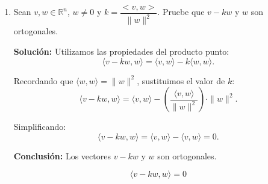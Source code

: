 \documentclass[a4paper]{article}
\begin{document}
\begin{enumerate}
\begin{enumerate}
    Satisfaciendo:
    \[
    A = P D P^{-1}
    \]

    \textbf{Conclusión:} \( A \) es diagonalizable, con:
    \[
    \boxed{
    D = \begin{pmatrix}
    1 & 0 & 0 \\
    0 & -1 & 0 \\
    0 & 0 & 3
    \end{pmatrix}, \quad
    P = \begin{pmatrix}
    1 & -1 & 0 \\
    0 & 1 & -1 \\
    0 & 0 & 2
    \end{pmatrix}
    }
    \]
\end{enumerate}
\item Sean $v,w \in \mathbb{R}^n$, $w\neq 0$ y $ k = \dfrac{<v,w>}{\|w\|^2}.$ Pruebe que $v-kw$ y $w$ son ortogonales.


\textbf{Solución:}
Utilizamos las propiedades del producto punto:
\[
\langle v - kw, w \rangle = \langle v, w \rangle - k \langle w, w \rangle.
\]

Recordando que \( \langle w, w \rangle = \|w\|^2 \), sustituimos el valor de \( k \):
\[
\langle v - kw, w \rangle = \langle v, w \rangle - \left( \frac{\langle v, w \rangle}{\|w\|^2} \right) \cdot \|w\|^2.
\]

Simplificando:
\[
\langle v - kw, w \rangle = \langle v, w \rangle - \langle v, w \rangle = 0.
\]

\textbf{Conclusión:}  
Los vectores \( v - kw \) y \( w \) son ortogonales.

\[
\boxed{ \langle v - kw, w \rangle = 0 }
\]
\end{enumerate}
\end{document}
